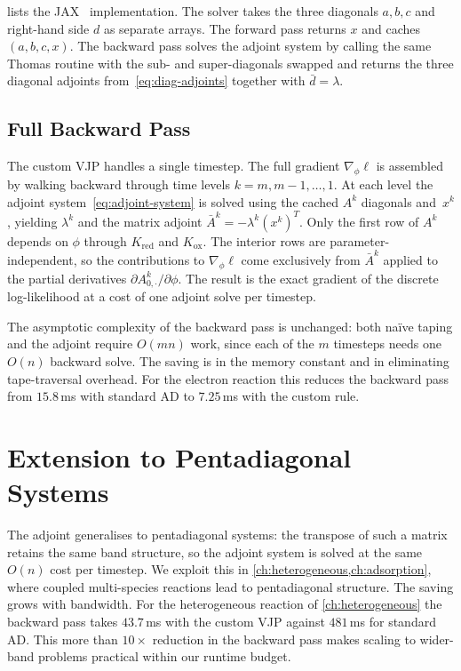  lists the JAX~\cite{jax2018github}
implementation. The solver takes the three diagonals $a, b, c$ and
right-hand side $d$ as separate arrays. The forward pass returns $x$
and caches $(a, b, c, x)$. The backward pass solves the adjoint
system by calling the same Thomas routine with the sub- and
super-diagonals swapped and returns the three diagonal adjoints
from~\cref{eq:diag-adjoints} together with $\bar{d} = \lambda$.

\subsection{Full Backward Pass}\label{sec:full-backward}

The custom VJP handles a single timestep. The full gradient
$\nabla_\phi \ell$ is assembled by walking backward through time levels
$k = m, m-1, \ldots, 1$. At each level the adjoint
system~\cref{eq:adjoint-system} is solved using the cached $A^k$ diagonals
and~$x^k$, yielding $\lambda^k$ and the matrix adjoint
$\bar{A}^k = -\lambda^k (x^k)^T$. Only the first row of $A^k$ depends
on $\phi$ through $K_{\mathrm{red}}$ and $K_{\mathrm{ox}}$. The
interior rows are parameter-independent, so
the contributions to $\nabla_\phi \ell$ come exclusively from $\bar{A}^k$
applied to the partial derivatives $\partial A^k_{0,\cdot} / \partial
\phi$. The result is the exact gradient of the discrete
log-likelihood at a cost of one adjoint solve per timestep.

The asymptotic complexity of the backward pass is unchanged: both
na\"ive taping and the adjoint require $O(mn)$ work, since each of the
$m$ timesteps needs one $O(n)$ backward solve. The saving is in the
memory constant and in eliminating tape-traversal overhead. For the
electron reaction this reduces the backward pass from
$15.8$\,ms with standard AD to $7.25$\,ms with the custom rule.

\section{Extension to Pentadiagonal Systems}\label{sec:pentadiagonal}

The adjoint generalises to pentadiagonal systems: the transpose
of such a matrix retains the same band structure, so the adjoint system
is solved at the same $O(n)$ cost per timestep. We exploit this in
\cref{ch:heterogeneous,ch:adsorption}, where coupled multi-species
reactions lead to pentadiagonal structure. The saving grows with
bandwidth. For the heterogeneous reaction of \cref{ch:heterogeneous}
the backward pass takes $43.7$\,ms with the custom VJP against
$481$\,ms for standard AD. This more than $10\times$ reduction in the
backward pass makes scaling to wider-band problems practical within
our runtime budget.

